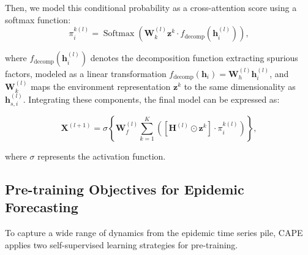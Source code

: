 Then, we model this conditional probability as a cross-attention score using a softmax function:
\[
\label{eq11}
\pi_i^{k(l)} = \operatorname{Softmax} \left( \mathbf{W}_k^{(l)} \mathbf{z}^k \cdot f_{\text{decomp}}(\mathbf{h}_i^{(l)}) \right), \tag{5}
\]

where \( f_{\text{decomp}}(\mathbf{h}_i^{(l)}) \) denotes the decomposition function extracting spurious factors, modeled as a linear transformation \( f_{\text{decomp}}(\mathbf{h}_i) = \mathbf{W}_h^{(l)} \mathbf{h}_i^{(l)} \), and \( \mathbf{W}_k^{(l)} \) maps the environment representation \( \mathbf{z}^k \) to the same dimensionality as \( \mathbf{h}_{s, i}^{(l)} \). Integrating these components, the final model can be expressed as:

\vspace{-3mm}
\[
\mathbf{X}^{(l+1)} = \sigma \left\{ \mathbf{W}_f^{(l)} \sum_{k=1}^{K} \left( [\mathbf{H}^{(l)} \odot \mathbf{z}^k] \cdot \pi_i^{k(l)} \right) \right\}, \tag{6}
\]
\vspace{-3mm}

where \( \sigma \) represents the activation function.



\subsection{Pre-training Objectives for Epidemic Forecasting}
\label{sec: contrast}
To capture a wide range of dynamics from the epidemic time series pile, CAPE applies two self-supervised learning strategies for pre-training. 


